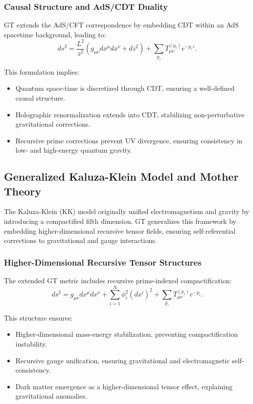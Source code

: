 \documentclass{article}
\theoremstyle{plain}
\begin{document}
\subsubsection{Causal Structure and AdS/CDT Duality}
GT extends the AdS/CFT correspondence by embedding CDT within an AdS spacetime background, leading to:
\begin{equation}
ds^2 = \frac{L^2}{z^2} \left( g_{\mu\nu} dx^\mu dx^\nu + dz^2 \right) + \sum_{p_i} T_{\mu\nu}^{(p_i)} e^{-p_i z}.
\end{equation}

This formulation implies:
\begin{itemize}
\item Quantum space-time is discretized through CDT, ensuring a well-defined causal structure.
\item Holographic renormalization extends into CDT, stabilizing non-perturbative gravitational corrections.
\item Recursive prime corrections prevent UV divergence, ensuring consistency in low- and high-energy quantum gravity.
\end{itemize}

\subsection{Generalized Kaluza-Klein Model and Mother Theory}
The Kaluza-Klein (KK) model originally unified electromagnetism and gravity by introducing a compactified fifth dimension. GT generalizes this framework by embedding higher-dimensional recursive tensor fields, ensuring self-referential corrections to gravitational and gauge interactions.

\subsubsection{Higher-Dimensional Recursive Tensor Structures}
The extended GT metric includes recursive prime-indexed compactification:
\begin{equation}
ds^2 = g_{\mu\nu} dx^\mu dx^\nu + \sum_{i=1}^{N} \phi_i^2 (dx^i)^2 + \sum_{p_i} T_{\mu\nu}^{(p_i)} e^{-p_i}.
\end{equation}

This structure ensures:
\begin{itemize}
\item Higher-dimensional mass-energy stabilization, preventing compactification instability.
\item Recursive gauge unification, ensuring gravitational and electromagnetic self-consistency.
\item Dark matter emergence as a higher-dimensional tensor effect, explaining gravitational anomalies.
\end{itemize}
\end{document}
